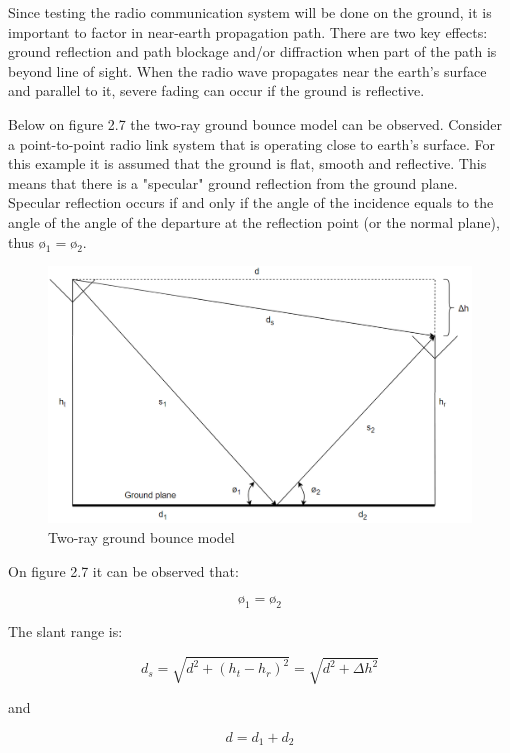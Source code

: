 Since testing the radio communication system will be done on the ground, it is important to factor in near-earth propagation path. There are two key effects: ground reflection and path blockage and/or diffraction when part of the path is beyond line of sight. When the radio wave propagates near the earth's surface and parallel to it, severe fading can occur if the ground is reflective. 

Below on figure 2.7 the two-ray ground bounce model can be observed. Consider a point-to-point radio link system that is operating close to earth's surface. For this example it is assumed that the ground is flat, smooth and reflective. This means that there is a "specular" ground reflection\cite{specular} from the ground plane. Specular reflection occurs if and only if the angle of the incidence equals to the angle of the angle of the departure at the reflection point (or the normal plane), thus $ø_1 = ø_2$. 

\begin{figure}[h]
\hspace{-0.5cm}
\includegraphics[scale=0.6]{figures/TwoRay.PNG}
\caption{Two-ray ground bounce model}
\end{figure}

On figure 2.7 it can be observed that:

$$ø_1 = ø_2$$

The slant range is:

\begin{equation}
  d_s = \sqrt{d^2 + (h_t - h_r)^2}= \sqrt{d^2 + \Delta h^2}
\end{equation}

and 

\begin{equation}
  d = d_1 + d_2
\end{equation}

